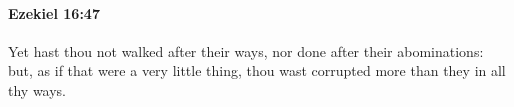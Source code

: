 
		\paragraph{Ezekiel 16:47} %
			\label{EZEKIEL-16-47}

			Yet hast thou not walked after their ways, nor done after their abominations: but, as if that were a very little thing, thou wast corrupted more than they in all thy ways.


